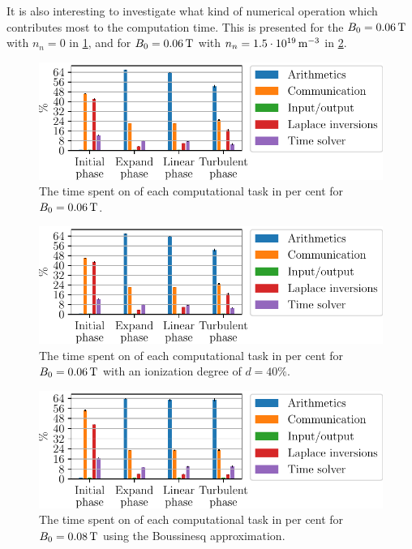 It is also interesting to investigate what kind of numerical operation which contributes most to the computation time.
This is presented for the $B_0 = 0.06\, \text{T}$ with $n_n=0$ in \cref{fig:BPct}, and for $B_0 = 0.06\, \text{T}$ with $n_n=1.5\cdot10^{19}\, \text{m}^{-3}$ in \cref{fig:neutPct}.
%
\begin{figure}[htb]
    \centering
    \includegraphics{fig/results/performance/PercentagesBScanB00_06}
    \caption{The time spent on of each computational task in per cent for $B_0=0.06\, \text{T}$.}
    \label{fig:BPct}
\end{figure}
%
%
\begin{figure}[htb]
    \centering
    \includegraphics{fig/results/performance/PercentagesNeutralScanB00_06Nn1_5e+19}
    \caption{The time spent on of each computational task in per cent for $B_0=0.06\, \text{T}$ with an ionization degree of $d=40\%$.}
    \label{fig:neutPct}
\end{figure}
%
%
\begin{figure}[h!]
    \centering
    \includegraphics{fig/results/performance/PercentagesBousScanB00_08}
    \caption{The time spent on of each computational task in per cent for $B_0=0.08\, \text{T}$ using the Boussinesq approximation.}
    \label{fig:BoussPct}
\end{figure}
